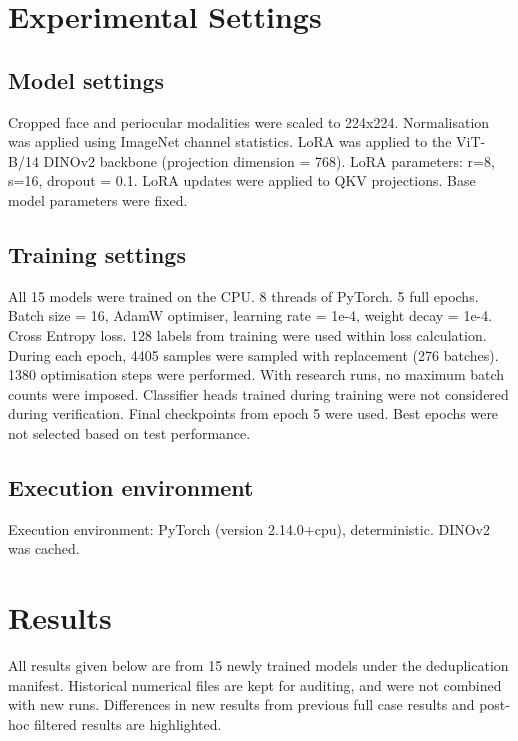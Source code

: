 \documentclass[10pt,lettersize,journal]{IEEEtran}
\begin{document}
\section{Experimental Settings}
\subsection{Model settings}
Cropped face and periocular modalities were scaled to 224x224. Normalisation was applied using ImageNet channel statistics. LoRA was applied to the ViT-B/14 DINOv2 backbone (projection dimension = 768). LoRA parameters: r=8, s=16, dropout = 0.1. LoRA updates were applied to QKV projections. Base model parameters were fixed.\par
\subsection{Training settings}
All 15 models were trained on the CPU. 8 threads of PyTorch. 5 full epochs. Batch size = 16, AdamW optimiser, learning rate = 1e-4, weight decay = 1e-4. Cross Entropy loss. 128 labels from training were used within loss calculation. During each epoch, 4405 samples were sampled with replacement (276 batches). 1380 optimisation steps were performed. With research runs, no maximum batch counts were imposed. Classifier heads trained during training were not considered during verification. Final checkpoints from epoch 5 were used. Best epochs were not selected based on test performance.\par
\subsection{Execution environment}
Execution environment: PyTorch (version 2.14.0+cpu), deterministic. DINOv2 was cached.\par
\section{Results}
All results given below are from 15 newly trained models under the deduplication manifest. Historical numerical files are kept for auditing, and were not combined with new runs. Differences in new results from previous full case results and post-hoc filtered results are highlighted.\par
\end{document}
